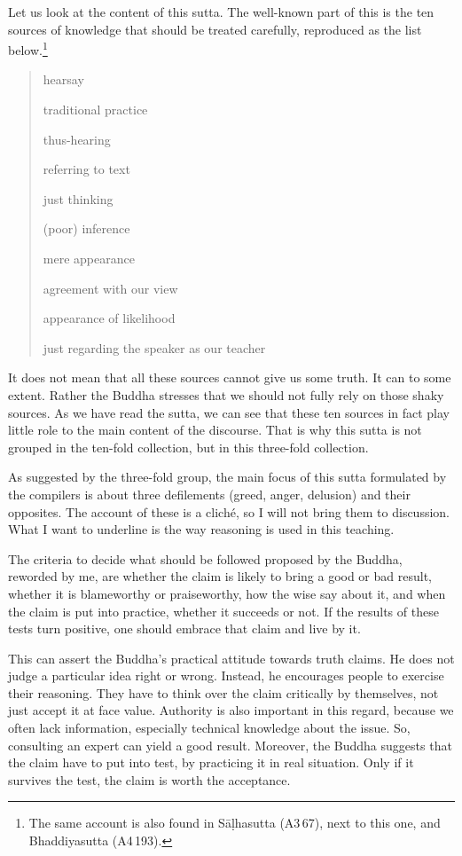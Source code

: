 Let us look at the content of this sutta. The well-known part of this is the ten sources of knowledge that should be treated carefully, reproduced as the list below.\footnote{The same account is also found in S\=a\d lhasutta (A3\,67), next to this one, and Bhaddiyasutta (A4\,193).}

\begin{quote}
\begin{compactenum}[(1)]
\item hearsay
\item traditional practice
\item thus-hearing
\item referring to text
\item just thinking
\item (poor) inference
\item mere appearance
\item agreement with our view
\item appearance of likelihood
\item just regarding the speaker as our teacher
\end{compactenum}
\end{quote}

It does not mean that all these sources cannot give us some truth. It can to some extent. Rather the Buddha stresses that we should not fully rely on those shaky sources. As we have read the sutta, we can see that these ten sources in fact play little role to the main content of the discourse. That is why this sutta is not grouped in the ten-fold collection, but in this three-fold collection.

As suggested by the three-fold group, the main focus of this sutta formulated by the compilers is about three defilements (greed, anger, delusion) and their opposites. The account of these is a clich\'e, so I will not bring them to discussion. What I want to underline is the way reasoning is used in this teaching.

The criteria to decide what should be followed proposed by the Buddha, reworded by me, are whether the claim is likely to bring a good or bad result, whether it is blameworthy or praiseworthy, how the wise say about it, and when the claim is put into practice, whether it succeeds or not. If the results of these tests turn positive, one should embrace that claim and live by it.

This can assert the Buddha's practical attitude towards truth claims. He does not judge a particular idea right or wrong. Instead, he encourages people to exercise their reasoning. They have to think over the claim critically by themselves, not just accept it at face value. Authority is also important in this regard, because we often lack information, especially technical knowledge about the issue. So, consulting an expert can yield a good result. Moreover, the Buddha suggests that the claim have to put into test, by practicing it in real situation. Only if it survives the test, the claim is worth the acceptance.


